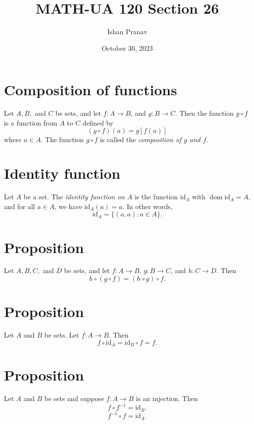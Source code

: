 \documentclass[12pt]{article}
\title{MATH-UA 120 Section 26}
\author{Ishan Pranav}
\date{October 30, 2023}
\DeclareMathOperator{\dom}{dom}
\begin{document}
\maketitle
\section*{Composition of functions}
Let $A,B,$ and $C$ be sets, and let $f:A\to B$, and $g:B\to C$. Then the function $g\circ f$ is a function from $A$ to $C$ defined by
\[(g\circ f)(a)=g\left[f(a)\right]\]
where $a\in A$. The function $g\circ f$ is called the \textit{composition of $g$ and $f$}.
\section*{Identity function}
Let $A$ be a set. The \textit{identity function on $A$} is the function $\mathrm{id}_A$ with $\dom{\mathrm{id}_A}=A$, and for all $a\in A$, we have $\mathrm{id}_A(a)=a$. In other words,
\[\mathrm{id}_A=\{(a,a):a\in A\}.\]
\section*{Proposition}
Let $A,B,C,$ and $D$ be sets, and let $f:A\to B$, $g:B\to C$, and $h:C\to D$. Then
\[h\circ(g\circ f)=(h\circ g)\circ f.\]
\section*{Proposition}
Let $A$ and $B$ be sets. Let $f:A\to B$. Then
\[f\circ\mathrm{id}_A=\mathrm{id}_B\circ f=f.\]
\section*{Proposition}
Let $A$ and $B$ be sets and suppose $f:A\to B$ is an injection. Then
\[f\circ f^{-1}=\mathrm{id}_B.\]
\[f^{-1}\circ f=\mathrm{id}_A.\]
\end{document}
